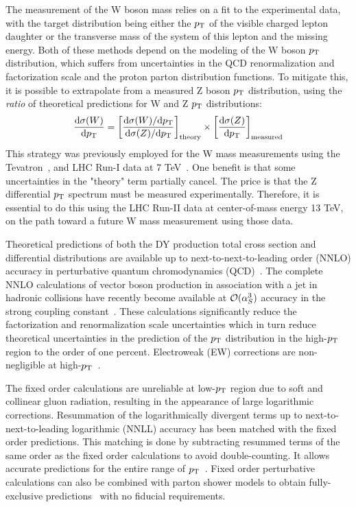 The measurement of the W boson mass relies on a fit to the experimental data, with the
target distribution being either the $p_{\mathrm{T}}$ of the visible charged lepton daughter
or the transverse mass of the system of this lepton and the missing energy.
Both of these methods depend on the modeling of the W boson $p_{\mathrm{T}}$ distribution,
which suffers from uncertainties in the QCD renormalization and factorization scale and the proton parton distribution functions.
To mitigate this, it is possible to extrapolate from a measured Z boson $p_{\mathrm{T}}$ distribution, using
the \textit{ratio} of theoretical predictions for W and Z $p_{\mathrm{T}}$ distributions:
\begin{equation}
\frac{\mathrm{d}\sigma(W)}{\mathrm{d} p_{\mathrm{T}}} = \left[ \frac{\mathrm{d}\sigma(W)/\mathrm{d}p_{\mathrm{T}} }{\mathrm{d}\sigma(Z)/\mathrm{d} p_{\mathrm{T}} } \right]_\mathrm{theory} \times \left[ \frac{\mathrm{d}\sigma(Z)}{\mathrm{d} p_{\mathrm{T}}} \right]_\mathrm{measured}
\end{equation}
This strategy was previously employed for the W mass measurements using the Tevatron~\cite{Abazov:2012bv},\cite{Aaltonen:2012bp} and LHC Run-I data at 7 TeV~\cite{Aaboud:2017svj}.
One benefit is that some uncertainties in the "theory" term partially cancel.
The price is that the Z differential $p_{\mathrm{T}}$ spectrum must be measured experimentally.
Therefore, it is essential to do this using the LHC Run-II data at center-of-mass energy 13 TeV,
on the path toward a future W mass measurement using those data.
      
Theoretical predictions of both the DY production total cross section and 
differential distributions are available up to next-to-next-to-leading order 
(NNLO) accuracy in perturbative quantum chromodynamics 
(QCD)~\cite{Melnikov:2006kv,Catani:2009sm}. The complete NNLO calculations of 
vector boson production in association with a jet in hadronic collisions have 
recently become available at $\mathcal{O}(\alpha_S^3)$ accuracy in the strong 
coupling constant~\cite{Ridder:2015dxa,Boughezal:2015ded,Boughezal:2015dva}. 
These calculations significantly reduce the factorization and renormalization scale 
uncertainties which in turn reduce theoretical uncertainties in the prediction 
of the $p_{\mathrm{T}}$ distribution in the high-$p_{\mathrm{T}}$ region to the order of one 
percent. Electroweak (EW) corrections are non-negligible at 
high-$p_{\mathrm{T}}$~\cite{Dittmaier:2014qza,Lindert:2017olm}.      

The fixed order calculations are unreliable at low-$p_{\mathrm{T}}$ region due to soft 
and collinear gluon radiation, resulting in the appearance of large logarithmic 
corrections.
Resummation of the logarithmically divergent terms up to next-to-next-to-leading logarithmic (NNLL) accuracy has been matched with the fixed order predictions.
This matching is done by subtracting resummed terms of the same order as the fixed order calculations to avoid double-counting.
It allows accurate predictions for the entire range of $p_{\mathrm{T}}$~\cite{Balazs:1995nz,Catani:2015vma}.
Fixed order perturbative calculations can also be combined with parton shower models to obtain 
fully-exclusive predictions~\cite{MCatNLO,Nason:2004rx,Frixione:2002ik,Alioli:2010xd} with
no fiducial requirements.      

